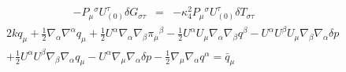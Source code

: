 \documentclass[10pt,letterpaper]{article}
\numberwithin{equation}{section}
\begin{document}
\begin{eqnarray}
-P_\mu{}^\sigma U^\tau_{(0)} \delta G_{\sigma\tau} &=& - \kappa^2_4 P_\mu{}^\sigma U^\tau_{(0)} \delta T_{\sigma\tau}
\end{eqnarray}
\begin{eqnarray}
&&2 k q_{\mu}
+ \tfrac{1}{2} \nabla_{\alpha}\nabla^{\alpha}q_{\mu}
+ \tfrac{1}{2} U^{\alpha} \nabla_{\alpha}\nabla_{\beta}\pi_{\mu}{}^{\beta}
-  \tfrac{1}{2} U^{\alpha} U_{\mu} \nabla_{\alpha}\nabla_{\beta}q^{\beta}
-  U^{\alpha} U^{\beta} U_{\mu} \nabla_{\beta}\nabla_{\alpha}\delta p\nonumber\\
&& + \tfrac{1}{2} U^{\alpha} U^{\beta} \nabla_{\beta}\nabla_{\alpha}q_{\mu}
-  U^{\alpha} \nabla_{\mu}\nabla_{\alpha}\delta p
-  \tfrac{1}{2} \nabla_{\mu}\nabla_{\alpha}q^{\alpha} = \bar q_\mu 
\end{eqnarray}
\end{document}
